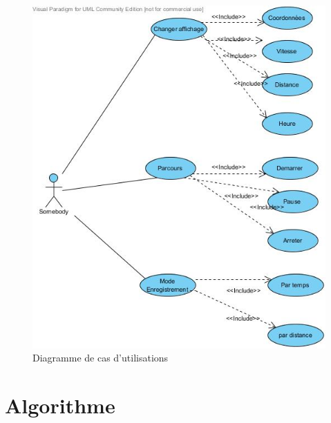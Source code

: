 \documentclass[a4paper,12pt,titlepage]{article}
\begin{document}
\begin{figure}[H]
	\centering
	\includegraphics[width=\textwidth]{use_case.jpg}
	\caption{Diagramme de cas d'utilisations}
	\label{usecase}
\end{figure}

\section{Algorithme}
\end{document}
